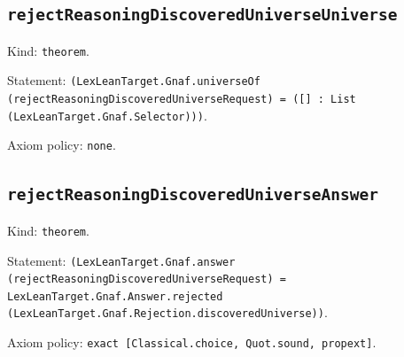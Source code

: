 \documentclass[11pt]{article}
\begin{document}
\subsection*{\texttt{rejectReasoningDiscoveredUniverseUniverse}}
\noindent Kind: \texttt{theorem}.\par
\noindent Statement: \texttt{(LexLeanTarget.Gnaf.universeOf (rejectReasoningDiscoveredUniverseRequest) = ([] : List (LexLeanTarget.Gnaf.Selector)))}.\par
\noindent Axiom policy: \texttt{none}.\par
\subsection*{\texttt{rejectReasoningDiscoveredUniverseAnswer}}
\noindent Kind: \texttt{theorem}.\par
\noindent Statement: \texttt{(LexLeanTarget.Gnaf.answer (rejectReasoningDiscoveredUniverseRequest) = LexLeanTarget.Gnaf.Answer.rejected (LexLeanTarget.Gnaf.Rejection.discoveredUniverse))}.\par
\noindent Axiom policy: \texttt{exact [Classical.choice, Quot.sound, propext]}.\par
\end{document}
